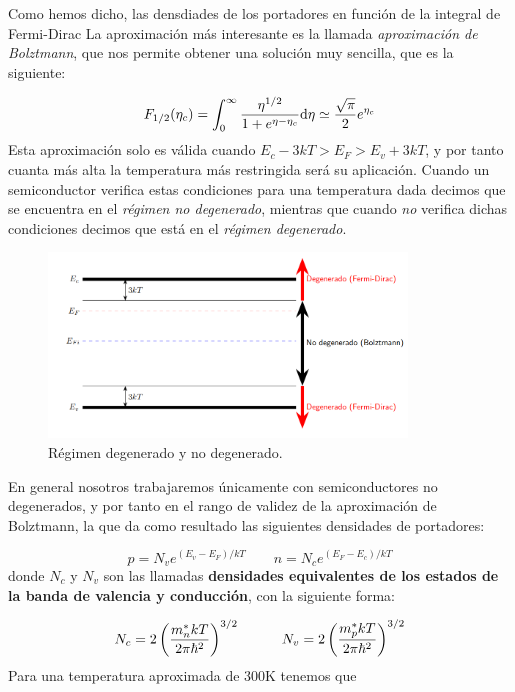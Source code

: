 Como hemos dicho, las densdiades de los portadores en función de la integral de Fermi-Dirac
La aproximación más interesante es la llamada \textit{aproximación de Bolztmann}, que nos permite obtener una solución muy sencilla, que es la siguiente:

\begin{equation}
	F_{1/2} (\eta_c) = \int_{0}^{\infty} \frac{\eta^{1/2}}{1+ e^{\eta-\eta_c}} \mathrm{d} \eta \simeq \frac{\sqrt{\pi}}{2} e^{\eta_c}
\end{equation}
Esta aproximación solo es válida cuando $E_c-3kT>E_F>E_v+3kT$, y por tanto cuanta más alta la temperatura más restringida será su aplicación. Cuando un semiconductor verifica estas condiciones para una temperatura dada decimos que se encuentra en el \textit{régimen no degenerado}, mientras que cuando \textit{no} verifica dichas condiciones decimos que está en el \textit{régimen degenerado}.

\begin{figure}[h!] \centering
	\includegraphics[width=0.85\textwidth]{Cuerpo/Ch_01/01_03.png}
	\caption{Régimen degenerado y no degenerado.}
\end{figure}


En general nosotros trabajaremos únicamente con semiconductores no degenerados, y por tanto en el rango de validez de la aproximación de Bolztmann, la que da como resultado las siguientes densidades de portadores:

\begin{equation}
	p=N_v e^{(E_v-E_F)/kT}  \qquad n = N_c e^{(E_F-E_c)/kT}
\end{equation}
donde $N_c$ y $N_v$ son las llamadas \textbf{densidades equivalentes de los estados de la banda de valencia y conducción}, con la siguiente forma:

\begin{equation}
	N_c = 2 \left( \frac{m_n^* kT}{2\pi\hbar^2} \right)^{3/2} \quad \quad \quad
	N_v = 2 \left( \frac{m_p^* kT}{2\pi\hbar^2} \right)^{3/2}
\end{equation}
Para una temperatura aproximada de $300$K tenemos que

